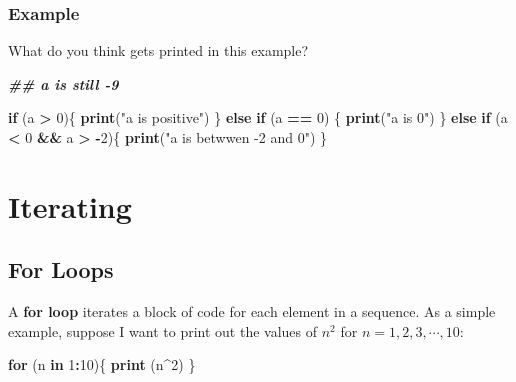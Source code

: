 \documentclass[
]{book}
\newenvironment{Shaded}{\begin{snugshade}}{\end{snugshade}}
\newcommand{\ControlFlowTok}[1]{\textcolor[rgb]{0.13,0.29,0.53}{\textbf{#1}}}
\newcommand{\DecValTok}[1]{\textcolor[rgb]{0.00,0.00,0.81}{#1}}
\newcommand{\DocumentationTok}[1]{\textcolor[rgb]{0.56,0.35,0.01}{\textbf{\textit{#1}}}}
\newcommand{\FunctionTok}[1]{\textcolor[rgb]{0.13,0.29,0.53}{\textbf{#1}}}
\newcommand{\NormalTok}[1]{#1}
\newcommand{\SpecialCharTok}[1]{\textcolor[rgb]{0.81,0.36,0.00}{\textbf{#1}}}
\newcommand{\StringTok}[1]{\textcolor[rgb]{0.31,0.60,0.02}{#1}}
\theoremstyle{definition}
\theoremstyle{definition}
\theoremstyle{definition}
\theoremstyle{definition}
\theoremstyle{remark}
\begin{document}
\hypertarget{example}{%
\subsubsection{Example}\label{example}}

What do you think gets printed in this example?

\begin{Shaded}
\begin{Highlighting}[]
\DocumentationTok{\#\# a is still {-}9}

\ControlFlowTok{if}\NormalTok{ (a }\SpecialCharTok{\textgreater{}} \DecValTok{0}\NormalTok{)\{}
  \FunctionTok{print}\NormalTok{(}\StringTok{"a is positive"}\NormalTok{)}
\NormalTok{\} }\ControlFlowTok{else} \ControlFlowTok{if}\NormalTok{ (a }\SpecialCharTok{==} \DecValTok{0}\NormalTok{) \{}
  \FunctionTok{print}\NormalTok{(}\StringTok{"a is 0"}\NormalTok{)}
\NormalTok{\} }\ControlFlowTok{else} \ControlFlowTok{if}\NormalTok{ (a }\SpecialCharTok{\textless{}} \DecValTok{0} \SpecialCharTok{\&\&}\NormalTok{ a }\SpecialCharTok{\textgreater{}} \SpecialCharTok{{-}}\DecValTok{2}\NormalTok{)\{}
  \FunctionTok{print}\NormalTok{(}\StringTok{"a is betwwen {-}2 and 0"}\NormalTok{)}
\NormalTok{\}}
\end{Highlighting}
\end{Shaded}

\hypertarget{iterating}{%
\section{Iterating}\label{iterating}}

\hypertarget{forloops}{%
\subsection{For Loops}\label{forloops}}

A \textbf{for loop} iterates a block of code for each element in a sequence. As a simple example, suppose I want to print out the values of \(n^2\) for \(n = 1, 2, 3, \cdots, 10\):

\begin{Shaded}
\begin{Highlighting}[]
\ControlFlowTok{for}\NormalTok{ (n }\ControlFlowTok{in} \DecValTok{1}\SpecialCharTok{:}\DecValTok{10}\NormalTok{)\{}
  \FunctionTok{print}\NormalTok{ (n}\SpecialCharTok{\^{}}\DecValTok{2}\NormalTok{)}
\NormalTok{\}}
\end{Highlighting}
\end{Shaded}
\end{document}
